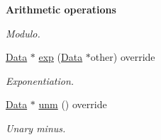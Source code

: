 \begin{Indent}{\bf Arithmetic operations}
\begin{DoxyCompactItemize}
\begin{DoxyCompactList}\small\item\em Modulo. \end{DoxyCompactList}\item 
\hyperlink{classcreek_1_1_data}{Data} $\ast$ \hyperlink{classcreek_1_1_object_af6a2412c45ca38a5f44c7d16e95ef9bf}{exp} (\hyperlink{classcreek_1_1_data}{Data} $\ast$other) override\hypertarget{classcreek_1_1_object_af6a2412c45ca38a5f44c7d16e95ef9bf}{}\label{classcreek_1_1_object_af6a2412c45ca38a5f44c7d16e95ef9bf}

\begin{DoxyCompactList}\small\item\em Exponentiation. \end{DoxyCompactList}\item 
\hyperlink{classcreek_1_1_data}{Data} $\ast$ \hyperlink{classcreek_1_1_object_a8ca0ede47fdfd40d90d3106dd8c9c9ce}{unm} () override\hypertarget{classcreek_1_1_object_a8ca0ede47fdfd40d90d3106dd8c9c9ce}{}\label{classcreek_1_1_object_a8ca0ede47fdfd40d90d3106dd8c9c9ce}

\begin{DoxyCompactList}\small\item\em Unary minus. \end{DoxyCompactList}\end{DoxyCompactItemize}
\end{Indent}
